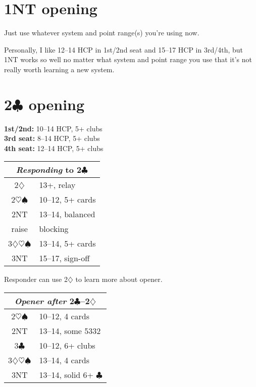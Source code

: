 \documentclass[a4paper, twoside, 11pt]{article}
\begin{document}
\begin{multicols}{3}
\section{1NT opening}

\normalfont
Just use whatever system and point range(s) you're using now.

Personally, I like 12--14 HCP in 1st/2nd seat and 15--17 HCP in 3rd/4th, but 1NT works so well no matter what system and point range you use that it's not really worth learning a new system.


\section{2$\clubsuit$ opening}


\textbf{1st/2nd:} 10--14 HCP, 5+ clubs \\
\textbf{3rd seat:} 8--14 HCP, 5+ clubs \\
\textbf{4th seat:} 12--14 HCP, 5+ clubs

\begin{center}
\begin{tabular}{ |c|l| }
 \hline
 \multicolumn{2}{|c|}{\textit{Responding} to 2$\clubsuit$} \\
 \hline
 2$\diamondsuit$ & 13+, relay\\
 2$\heartsuit\spadesuit$ & 10--12, 5+ cards\\
 2NT &  13--14, balanced\\
 raise & blocking\\
 3$\diamondsuit\heartsuit\spadesuit$ & 13--14, 5+ cards \\
 3NT & 15--17, sign-off \\
 \hline
\end{tabular}
\end{center}

Responder can use 2$\diamondsuit$ to learn more about opener.
\begin{center}
\begin{tabular}{ |c|l| }
 \hline
 \multicolumn{2}{|c|}{\textit{Opener after} 2$\clubsuit$--2$\diamondsuit$} \\
 \hline
 2$\heartsuit\spadesuit$ & 10--12, 4 cards\\
 2NT &  13--14, some 5332 \\
3$\clubsuit$ & 10--12, 6+ clubs\\
 3$\diamondsuit\heartsuit\spadesuit$ & 13--14, 4 cards \\
 3NT & 13--14, solid 6+ $\clubsuit$ \\
 \hline
\end{tabular}
\end{center}


\end{multicols}
\end{document}
